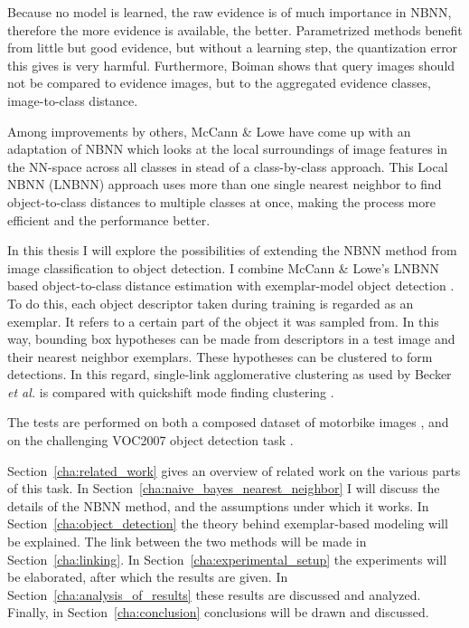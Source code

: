 Because no model is learned, the raw evidence is of much importance in NBNN, therefore the more evidence is available, the better. Parametrized methods benefit from little but good evidence, but without a learning step, the quantization error this gives is very harmful. Furthermore, Boiman shows that query images should not be compared to evidence images, but to the aggregated evidence classes, image-to-class distance.

Among improvements by others, McCann \& Lowe \cite{mccann2012local} have come up with an adaptation of NBNN which looks at the local surroundings of image features in the NN-space across all classes in stead of a class-by-class approach. This Local NBNN (LNBNN) approach uses more than one single nearest neighbor to find object-to-class distances to multiple classes at once, making the process more efficient and the performance better. 

In this thesis I will explore the possibilities of extending the NBNN method from image classification to object detection. I combine McCann \& Lowe's LNBNN based object-to-class distance estimation with exemplar-model object detection \cite{becker2012codebook, chum2007exemplar}. To do this, each object descriptor taken during training is regarded as an exemplar. It refers to a certain part of the object it was sampled from. In this way, bounding box hypotheses can be made from descriptors in a test image and their nearest neighbor exemplars. These hypotheses can be clustered to form detections. In this regard, single-link agglomerative clustering as used by Becker \emph{et al.} \cite{becker2012codebook} is compared with quickshift mode finding clustering .

The tests are performed on both a composed dataset of motorbike images \cite{becker2012codebook, fritz2005integrating}, and on the challenging VOC2007 object detection task \cite{pascal-voc-2007}.


Section~\ref{cha:related_work} gives an overview of related work on the various parts of this task. In Section~\ref{cha:naive_bayes_nearest_neighbor} I will discuss the details of the NBNN method, and the assumptions under which it works. In Section~\ref{cha:object_detection} the theory behind exemplar-based modeling will be explained. The link between the two methods will be made in Section~\ref{cha:linking}. In Section~\ref{cha:experimental_setup} the experiments will be elaborated, after which the results are given. In Section~\ref{cha:analysis_of_results} these results are discussed and analyzed. Finally, in Section~\ref{cha:conclusion} conclusions will be drawn and discussed.

